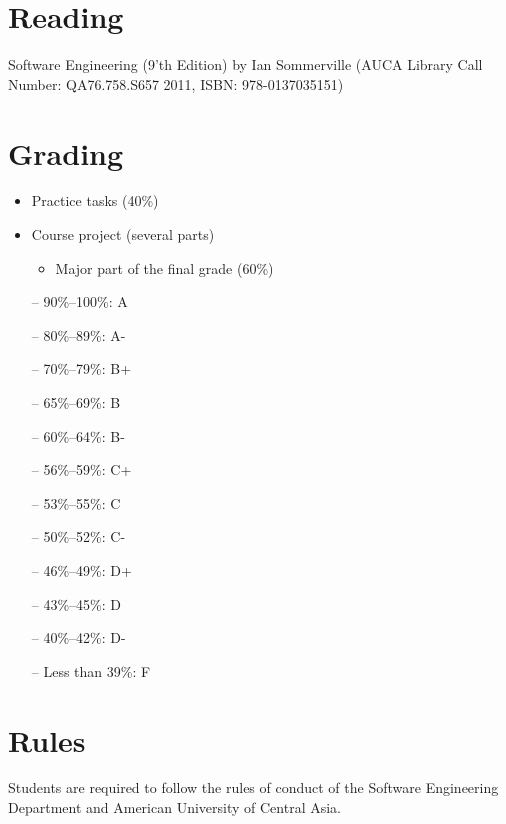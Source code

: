\documentclass[12pt,a4paper,oneside]{article}
\begin{document}
    \section{Reading}

        Software Engineering (9'th Edition) by Ian Sommerville (AUCA Library Call Number: QA76.758.S657 2011, ISBN: 978-0137035151)

    \section{Grading}

        \begin{itemize}
            \item Practice tasks (40\%)
            \item Course project (several parts)
            \begin{itemize}
                \item Major part of the final grade (60\%)
            \end{itemize}
        \end{itemize}

        \begin{itemize} \itemsep-10pt \parskip0pt 
            \item[--] 90\%--100\%: A\\
            \item[--] 80\%--89\%: A-\\
            \item[--] 70\%--79\%: B+\\
            \item[--] 65\%--69\%: B\\
            \item[--] 60\%--64\%: B-\\
            \item[--] 56\%--59\%: C+\\
            \item[--] 53\%--55\%: C\\
            \item[--] 50\%--52\%: C-\\
            \item[--] 46\%--49\%: D+\\
            \item[--] 43\%--45\%: D\\
            \item[--] 40\%--42\%: D-\\
            \item[--] Less than 39\%: F
        \end{itemize}

    \section{Rules}

        Students are required to follow the rules of conduct of the Software Engineering Department and American University of Central Asia.
\end{document}
